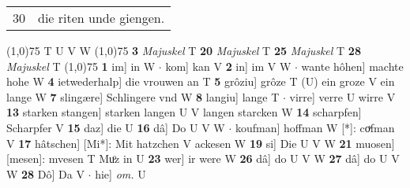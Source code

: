 \documentclass[8pt,a4paper,notitlepage]{article}
\begin{document}
\begin{table}[ht]
\begin{minipage}[t]{0.5\linewidth}
\begin{tabular}{rl}
30 & die riten unde giengen.\\ 
\end{tabular}
\scriptsize
\line(1,0){75} \newline
T U V W \newline
\line(1,0){75} \newline
\textbf{3} \textit{Majuskel} T  \textbf{20} \textit{Majuskel} T  \textbf{25} \textit{Majuskel} T  \textbf{28} \textit{Majuskel} T  \newline
\line(1,0){75} \newline
\textbf{1} im] in W  $\cdot$ kom] kan V \textbf{2} in] im V W  $\cdot$ wante hôhen] machte hohe W \textbf{4} ietwederhalp] die vrouwen an T \textbf{5} grôziu] grôze T (U) ein groze V ein lange W \textbf{7} slingære] Schlingere vnd W \textbf{8} langiu] lange T  $\cdot$ virre] verre U wirre V \textbf{13} starken stangen] starken langen U V langen starcken W \textbf{14} scharpfen] Scharpfer V \textbf{15} daz] die U \textbf{16} dâ] Do U V W  $\cdot$ koufman] hoffman W [*]: coͮfman V \textbf{17} hâtschen] [Mi*]: Mit hatzchen V ackesen W \textbf{19} si] Die U V W \textbf{21} muosen] [mesen]: mvesen T Muͦz in U \textbf{23} wer] ir were W \textbf{26} dâ] do U V W \textbf{27} dâ] do U V W \textbf{28} Dô] Da V  $\cdot$ hie] \textit{om.} U \newline
\end{minipage}
\end{table}
\end{document}
